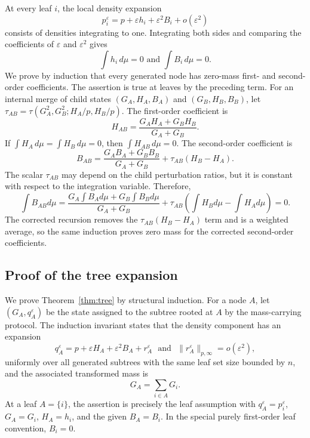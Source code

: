 \documentclass[11pt]{article}
\theoremstyle{plain}
\theoremstyle{definition}
\theoremstyle{definition}
\newcommand{\eps}{\varepsilon}
\begin{document}
At every leaf $i$, the local density expansion
\[
p_i^\eps=p+\eps h_i+\eps^2B_i+o(\eps^2)
\]
consists of densities integrating to one. Integrating both sides and comparing the coefficients of $\eps$ and $\eps^2$ gives
\[
\int h_i\,d\mu=0 \,\,\text{and}\,\,
\int B_i\,d\mu=0.
\]
We prove by induction that every generated node has zero-mass first- and second-order coefficients. The assertion is true at leaves by the preceding term. For an internal merge of child states $(G_A,H_A,B_A)$ and $(G_B,H_B,B_B)$, let
$\tau_{AB}=\tau(G_A^2,G_B^2;H_A/p,H_B/p)$. The first-order coefficient is
\[
H_{AB}=\frac{G_AH_A+G_BH_B}{G_A+G_B}.
\]
If $\int H_A\,d\mu=\int H_B\,d\mu=0$, then $\int H_{AB}\,d\mu=0$. The second-order coefficient is
\[
B_{AB}=\frac{G_AB_A+G_BB_B}{G_A+G_B}+\tau_{AB}(H_B-H_A).
\]
The scalar $\tau_{AB}$ may depend on the child perturbation ratios, but it is constant with respect to the integration variable. Therefore,
\[
\int B_{AB}d\mu=\frac{G_A\int B_Ad\mu+G_B\int B_Bd\mu}{G_A+G_B}+\tau_{AB}\left(\int H_Bd\mu-\int H_Ad\mu\right)=0.
\]
The corrected recursion removes the $\tau_{AB}(H_B-H_A)$ term and is a weighted average, so the same induction proves zero mass for the corrected second-order coefficients.

\subsection{Proof of the tree expansion}

We prove Theorem~\ref{thm:tree} by structural induction. For a node $A$, let $(G_A,q_A^\eps)$ be the state assigned to the subtree rooted at $A$ by the mass-carrying protocol. The induction invariant states that the density component has an expansion
\[
q_A^\eps=p+\eps H_A+\eps^2B_A+r_A^\eps
\,\,\,\,\text{and}\,\,\,\,
\|r_A^\eps\|_{p,\infty}=o(\eps^2),
\]
uniformly over all generated subtrees with the same leaf set size bounded by $n$, and the associated transformed mass is
\[
G_A=\sum_{i\in A}G_i.
\]
At a leaf $A=\{i\}$, the assertion is precisely the leaf assumption with $q_A^\eps=p_i^\eps$, $G_A=G_i$, $H_A=h_i$, and the given $B_A=B_i$. In the special purely first-order leaf convention, $B_i=0$.
\end{document}

